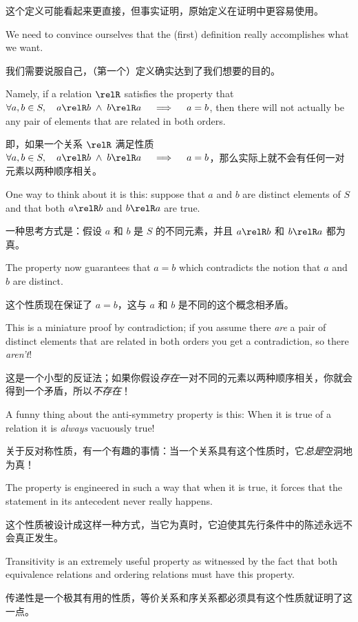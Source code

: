 这个定义可能看起来更直接，但事实证明，原始定义在证明中更容易使用。

We need to convince ourselves that the (first) definition really
accomplishes what we want.

我们需要说服自己，（第一个）定义确实达到了我们想要的目的。

Namely, if a relation $\relR$ satisfies the property that
$\displaystyle \forall a,b \in S, \quad a \relR b \; \land \;
b \relR a \quad \implies \quad a=b$,
then there will not actually be any pair of elements that are related in both orders.

即，如果一个关系 $\relR$ 满足性质 $\displaystyle \forall a,b \in S, \quad a \relR b \; \land \; b \relR a \quad \implies \quad a=b$，那么实际上就不会有任何一对元素以两种顺序相关。

One
way to think about it is this: suppose that $a$ and $b$ are distinct elements of $S$ and
that both $a \relR b$ and $b \relR a$ are true.

一种思考方式是：假设 $a$ 和 $b$ 是 $S$ 的不同元素，并且 $a \relR b$ 和 $b \relR a$ 都为真。

The property now guarantees that $a=b$
which contradicts the notion that $a$ and $b$ are distinct.

这个性质现在保证了 $a=b$，这与 $a$ 和 $b$ 是不同的这个概念相矛盾。

This is a miniature proof
by contradiction; if you assume there \emph{are} a pair of distinct elements that are
related in both orders you get a contradiction, so there \emph{aren't}!

这是一个小型的反证法；如果你假设\emph{存在}一对不同的元素以两种顺序相关，你就会得到一个矛盾，所以\emph{不存在}！

A funny thing about the anti-symmetry property is this:  When it is true of a relation it 
is \emph{always} vacuously true!

关于反对称性质，有一个有趣的事情：当一个关系具有这个性质时，它\emph{总是}空洞地为真！

The property is engineered in such a way that when it is
true, it forces that the statement in its antecedent never really happens.

这个性质被设计成这样一种方式，当它为真时，它迫使其先行条件中的陈述永远不会真正发生。

Transitivity is an extremely useful property as witnessed by the fact that both equivalence
relations and ordering relations must have this property.

传递性是一个极其有用的性质，等价关系和序关系都必须具有这个性质就证明了这一点。

